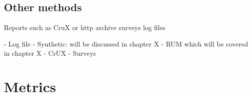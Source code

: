 








\subsection{Other methods}

Reports such as CruX or http archive
surveys
log files



- Log file
- Synthetic: will be discussed in chapter X
- RUM which will be covered in chapter X
- CrUX
- Surveys







\section{Metrics}












